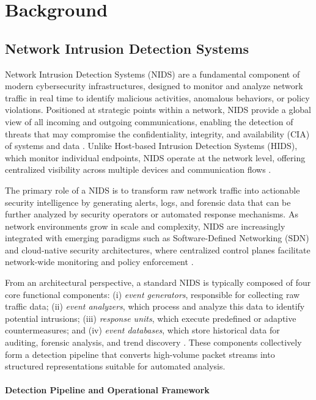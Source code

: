 \chapter{Background}
\label{cha:background}
\section{Network Intrusion Detection Systems}
Network Intrusion Detection Systems (NIDS) are a fundamental component of modern cybersecurity infrastructures, designed to monitor and analyze network traffic in real time to identify malicious activities, anomalous behaviors, or policy violations. Positioned at strategic points within a network, NIDS provide a global view of all incoming and outgoing communications, enabling the detection of threats that may compromise the confidentiality, integrity, and availability (CIA) of systems and data \cite{abou2020investigating, ibitoye2025threat}. Unlike Host-based Intrusion Detection Systems (HIDS), which monitor individual endpoints, NIDS operate at the network level, offering centralized visibility across multiple devices and communication flows \cite{madani2018robustness}.

The primary role of a NIDS is to transform raw network traffic into actionable security intelligence by generating alerts, logs, and forensic data that can be further analyzed by security operators or automated response mechanisms. As network environments grow in scale and complexity, NIDS are increasingly integrated with emerging paradigms such as Software-Defined Networking (SDN) and cloud-native security architectures, where centralized control planes facilitate network-wide monitoring and policy enforcement \cite{ayub2020model, dhadhania2024unleashing}.

From an architectural perspective, a standard NIDS is typically composed of four core functional components: (i) \textit{event generators}, responsible for collecting raw traffic data; (ii) \textit{event analyzers}, which process and analyze this data to identify potential intrusions; (iii) \textit{response units}, which execute predefined or adaptive countermeasures; and (iv) \textit{event databases}, which store historical data for auditing, forensic analysis, and trend discovery \cite{corona2013adversarial}. These components collectively form a detection pipeline that converts high-volume packet streams into structured representations suitable for automated analysis.

\subsubsection{Detection Pipeline and Operational Framework}

